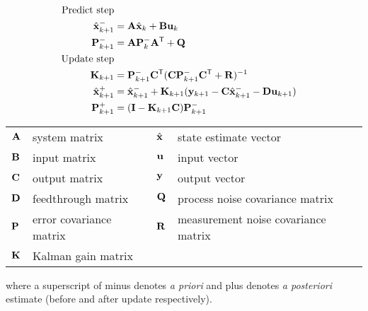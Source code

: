 \begin{theorem}
  \label{thm:kalman_filter}
  \begin{align}
    \text{Predict step} \nonumber \\
    \hat{\mathbf{x}}_{k+1}^- &= \mathbf{A}\hat{\mathbf{x}}_k + \mathbf{B} \mathbf{u}_k \\
    \mathbf{P}_{k+1}^- &= \mathbf{A} \mathbf{P}_k^- \mathbf{A}^\mathsf{T} + \mathbf{Q} \\
    \text{Update step} \nonumber \\
    \mathbf{K}_{k+1} &=
      \mathbf{P}_{k+1}^- \mathbf{C}^\mathsf{T} (\mathbf{C}\mathbf{P}_{k+1}^- \mathbf{C}^\mathsf{T} +
      \mathbf{R})^{-1} \\
    \hat{\mathbf{x}}_{k+1}^+ &=
      \hat{\mathbf{x}}_{k+1}^- + \mathbf{K}_{k+1}(\mathbf{y}_{k+1} -
      \mathbf{C} \hat{\mathbf{x}}_{k+1}^- - \mathbf{D}\mathbf{u}_{k+1}) \\
    \mathbf{P}_{k+1}^+ &= (\mathbf{I} - \mathbf{K}_{k+1}\mathbf{C})\mathbf{P}_{k+1}^-
  \end{align}
  \begin{figurekey}
    \begin{tabular}{llll}
      $\mathbf{A}$ & system matrix & $\hat{\mathbf{x}}$ & state estimate vector \\
      $\mathbf{B}$ & input matrix       & $\mathbf{u}$ & input vector \\
      $\mathbf{C}$ & output matrix      & $\mathbf{y}$ & output vector \\
      $\mathbf{D}$ & feedthrough matrix & $\mathbf{Q}$ & process noise covariance matrix \\
      $\mathbf{P}$ & error covariance matrix & $\mathbf{R}$ & measurement noise covariance matrix \\
      $\mathbf{K}$ & Kalman gain matrix & &
    \end{tabular}
  \end{figurekey}

  where a superscript of minus denotes \textit{a priori} and plus denotes
  \textit{a posteriori} estimate (before and after update respectively).
\end{theorem}

